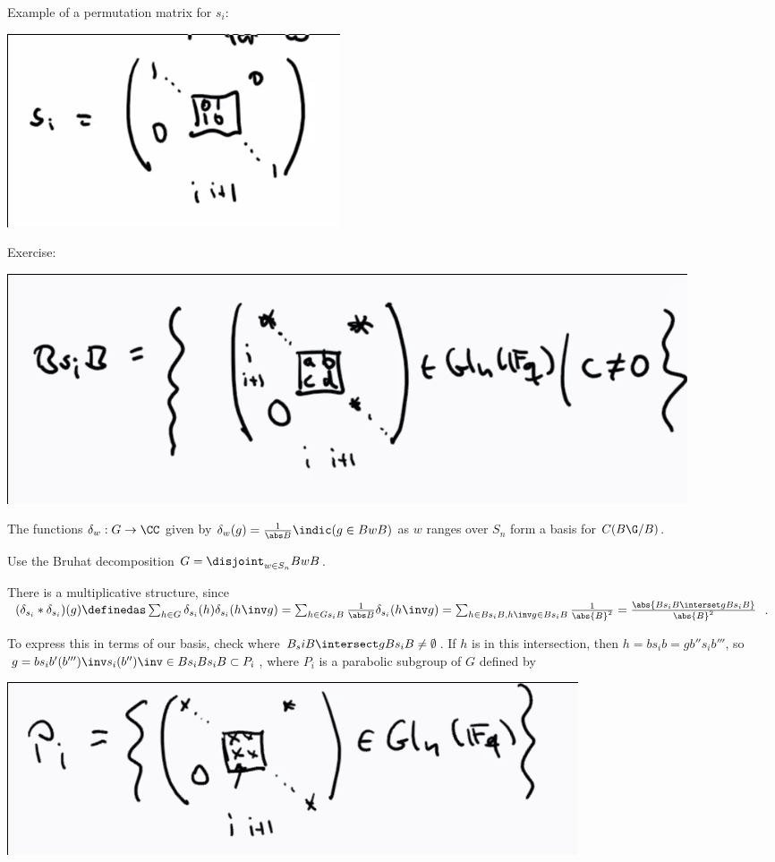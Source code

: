 Example of a permutation matrix for \(s_i\):

\includegraphics{figures/image_2020-07-09-11-37-26.png}

Exercise:

\includegraphics{figures/image_2020-07-09-11-38-04.png}

\begin{description}
\tightlist
\item[Proposition]
The functions \(\delta_w: G\to \CC\) given by
\(\delta_w(g) = {1\over \abs B}\indic(g\in BwB)\) as \(w\) ranges over
\(S_n\) form a basis for \(C(B\G/B)\).
\item[Proof]
Use the Bruhat decomposition \(G = \disjoint_{w\in S_n} BwB\).
\end{description}

There is a multiplicative structure, since
\((\delta_{s_i} \ast \delta_{s_i})(g) \definedas \sum_{h\in G} \delta_{s_i}(h) \delta_{s_i}(h\inv g) = \sum_{h\in Gs_i B} {1\over \abs B} \delta_{s_i} (h\inv g) = \sum_{h\in Bs_i B, h\inv g\in Bs_i B} {1\over \abs{B}^2} = {\abs{Bs_i B \interset gBs_i B} \over \abs{B}^2}\).

To express this in terms of our basis, check where
\(B_si B \intersect g B s_i B \neq \emptyset\). If \(h\) is in this
intersection, then \(h = bs_i b = gb'' s_i b'''\), so
\(g = b s_i b' (b''')\inv s_i (b'')\inv \in Bs_i Bs_i B \subset P_i\),
where \(P_i\) is a parabolic subgroup of \(G\) defined by

\includegraphics{figures/image_2020-07-09-11-47-18.png}

